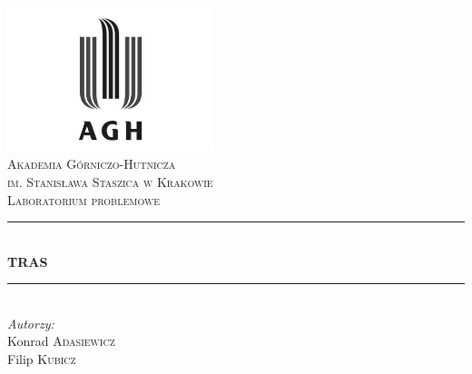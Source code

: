 \begin{titlepage}

\newcommand{\HRule}{\rule{\linewidth}{0.5mm}}

\center
 

\includegraphics[width=6cm]{../res/img/logo.png}\\[1cm]
 
 

\textsc{\LARGE Akademia Górniczo-Hutnicza \\[0.2cm]
im. Stanisława Staszica w Krakowie}\\[1.5cm]

\textsc{\Large Laboratorium problemowe}\\[0.5cm]


\HRule \\[0.5cm]
{ \huge \bfseries TRAS}\\[0.3cm]
\HRule \\[1.5cm]

\flushright
\Large \emph{Autorzy:}\\
Konrad \textsc{Adasiewicz}\\[0.1cm]  %
Filip \textsc{Kubicz}\\[3cm]        %



\vfill %

\end{titlepage}